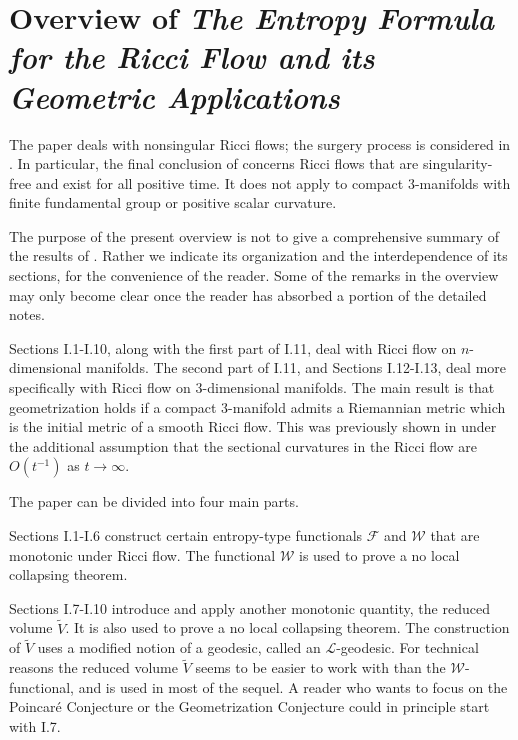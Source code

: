 \documentclass[12pt]{amsart}
\numberwithin{equation}{section}
\theoremstyle{plain}
\theoremstyle{definition}
\theoremstyle{remark}
\begin{document}
\section{Overview of
 {\em The Entropy Formula for the Ricci 
Flow and its Geometric
Applications} 
\cite{Perelman}}
\label{overview1}

The paper \cite{Perelman} deals with nonsingular Ricci flows;
the surgery process is considered in \cite{Perelman2}.
In particular, the final conclusion of \cite{Perelman} concerns
Ricci flows that are singularity-free and exist for all positive time. 
It does not apply
to compact $3$-manifolds with finite fundamental group or
positive scalar curvature.

The purpose of the present overview is not to give a comprehensive
summary of the results of \cite{Perelman}. Rather we indicate its
organization and the interdependence of its sections, for the
convenience of the reader.  
Some of the remarks in the overview
may only become clear once the reader has absorbed 
a portion of the detailed notes. 

Sections I.1-I.10, along with the first part of I.11, deal with Ricci flow on
$n$-dimensional manifolds.  The second part of I.11, and Sections I.12-I.13, deal
more specifically with Ricci flow on $3$-dimensional manifolds.
The main result is that geometrization holds if a compact $3$-manifold
admits a Riemannian metric which is the initial metric of a smooth
Ricci flow.  This was previously shown in \cite{Hamiltonn} under the
additional assumption that the sectional curvatures in the Ricci flow
are $O(t^{-1})$ as $t \rightarrow \infty$.

The paper \cite{Perelman} can be divided into four main parts.  

Sections I.1-I.6 construct
certain entropy-type functionals ${\mathcal F}$ and ${\mathcal W}$
that are monotonic under Ricci flow. The functional ${\mathcal W}$ is
used to prove a no local collapsing theorem.

Sections I.7-I.10 introduce and apply another monotonic quantity,
the reduced volume $\tilde{V}$. It is also used to prove a
no local collapsing theorem.  The construction of $\tilde{V}$ uses
a modified notion of a geodesic, called an ${\mathcal L}$-geodesic.
For technical reasons the reduced volume $\tilde{V}$ seems to be
easier to work with than the ${\mathcal W}$-functional, and is used
in most of the sequel.  
A reader who wants to focus on the Poincar\'e Conjecture or the
Geometrization Conjecture could
in principle start with I.7.
\end{document}
